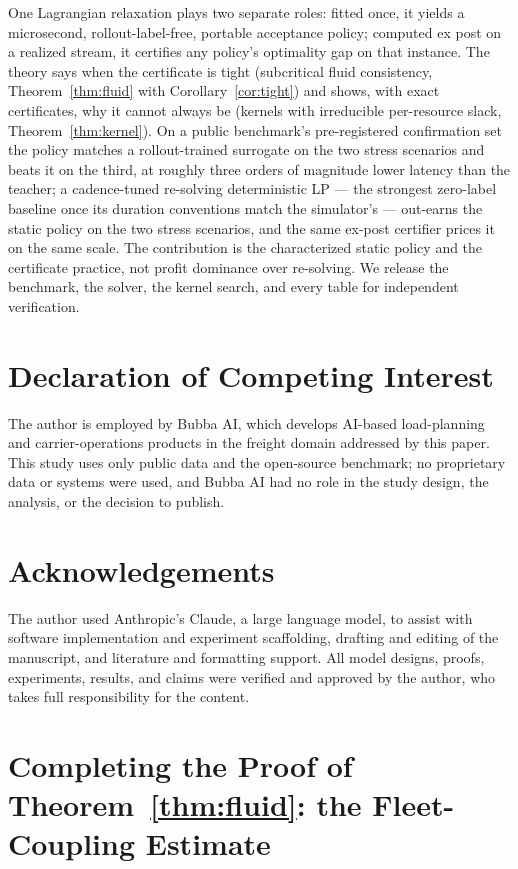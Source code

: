 \documentclass[11pt]{article}
\begin{document}
One Lagrangian relaxation plays two separate roles: fitted once, it
yields a microsecond, rollout-label-free, portable acceptance policy;
computed ex post on a realized stream, it certifies any policy's
optimality gap on that instance. The theory says when the
certificate is tight (subcritical fluid consistency,
Theorem~\ref{thm:fluid} with Corollary~\ref{cor:tight}) and shows,
with exact certificates, why it cannot always be (kernels with
irreducible per-resource slack, Theorem~\ref{thm:kernel}). On a public
benchmark's pre-registered confirmation set the policy matches a
rollout-trained surrogate on the two stress scenarios and beats it
on the third, at
roughly three orders of magnitude lower
latency than the teacher; a cadence-tuned re-solving deterministic LP
--- the strongest zero-label baseline once its duration conventions
match the simulator's --- out-earns the static policy on the two
stress scenarios, and the same ex-post certifier prices it on the
same scale. The contribution is the characterized static policy and
the certificate practice, not profit dominance over re-solving. We
release the benchmark, the solver, the
kernel search, and every table for independent verification.

\section*{Declaration of Competing Interest}

The author is employed by Bubba AI, which develops AI-based
load-planning and carrier-operations products in the freight domain
addressed by this paper. This study uses only public data and the
open-source benchmark; no proprietary data or systems were used, and
Bubba AI had no role in the study design, the analysis, or the decision
to publish.

\section*{Acknowledgements}

The author used Anthropic's Claude, a large language model, to assist
with software implementation and experiment scaffolding, drafting and
editing of the manuscript, and literature and formatting support. All
model designs, proofs, experiments, results, and claims were verified
and approved by the author, who takes full responsibility for the
content.

\appendix

\section{Completing the Proof of Theorem~\ref{thm:fluid}: the
Fleet-Coupling Estimate}
\label{sec:coupling}
\end{document}
